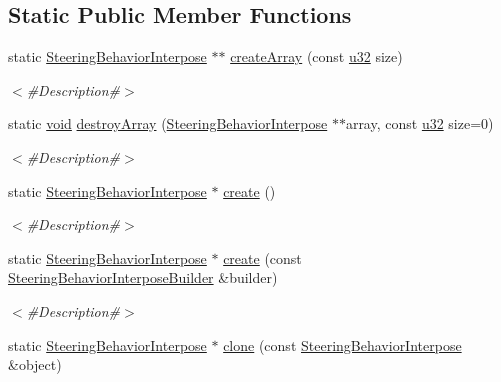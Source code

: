 \subsection*{Static Public Member Functions}
\begin{DoxyCompactItemize}
\item 
static \mbox{\hyperlink{classnjli_1_1_steering_behavior_interpose}{Steering\+Behavior\+Interpose}} $\ast$$\ast$ \mbox{\hyperlink{classnjli_1_1_steering_behavior_interpose_a7b1ea421777fb90c031b30122788bcbd}{create\+Array}} (const \mbox{\hyperlink{_util_8h_a10e94b422ef0c20dcdec20d31a1f5049}{u32}} size)
\begin{DoxyCompactList}\small\item\em $<$\#\+Description\#$>$ \end{DoxyCompactList}\item 
static \mbox{\hyperlink{_thread_8h_af1e856da2e658414cb2456cb6f7ebc66}{void}} \mbox{\hyperlink{classnjli_1_1_steering_behavior_interpose_a611b45b2f46cf9fe0716c9f00b75bf38}{destroy\+Array}} (\mbox{\hyperlink{classnjli_1_1_steering_behavior_interpose}{Steering\+Behavior\+Interpose}} $\ast$$\ast$array, const \mbox{\hyperlink{_util_8h_a10e94b422ef0c20dcdec20d31a1f5049}{u32}} size=0)
\begin{DoxyCompactList}\small\item\em $<$\#\+Description\#$>$ \end{DoxyCompactList}\item 
static \mbox{\hyperlink{classnjli_1_1_steering_behavior_interpose}{Steering\+Behavior\+Interpose}} $\ast$ \mbox{\hyperlink{classnjli_1_1_steering_behavior_interpose_a72a13c389235c9c38841563ece871812}{create}} ()
\begin{DoxyCompactList}\small\item\em $<$\#\+Description\#$>$ \end{DoxyCompactList}\item 
static \mbox{\hyperlink{classnjli_1_1_steering_behavior_interpose}{Steering\+Behavior\+Interpose}} $\ast$ \mbox{\hyperlink{classnjli_1_1_steering_behavior_interpose_a8f3890db691eeadac43a976f51e25a68}{create}} (const \mbox{\hyperlink{classnjli_1_1_steering_behavior_interpose_builder}{Steering\+Behavior\+Interpose\+Builder}} \&builder)
\begin{DoxyCompactList}\small\item\em $<$\#\+Description\#$>$ \end{DoxyCompactList}\item 
static \mbox{\hyperlink{classnjli_1_1_steering_behavior_interpose}{Steering\+Behavior\+Interpose}} $\ast$ \mbox{\hyperlink{classnjli_1_1_steering_behavior_interpose_a1d3fd4e43052faf9f0e34bd86990e962}{clone}} (const \mbox{\hyperlink{classnjli_1_1_steering_behavior_interpose}{Steering\+Behavior\+Interpose}} \&object)

\end{DoxyCompactItemize}
